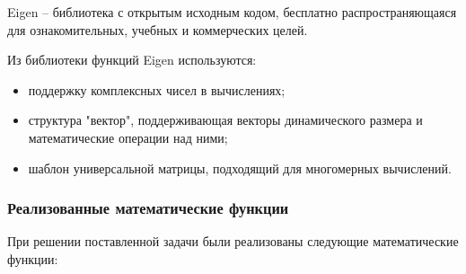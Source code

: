 Eigen -- библиотека с открытым исходным кодом, бесплатно распространяющаяся для ознакомительных, учебных и коммерческих целей. 

Из библиотеки функций Eigen используются:
\begin{itemize}
    \item поддержку комплексных чисел в вычислениях;
    \item структура "вектор", поддерживающая векторы динамического размера и математические операции над ними;
    \item шаблон универсальной матрицы, подходящий для многомерных вычислений. 
\end{itemize}

\newpage
\subsubsection{\textbf{Реализованные математические функции}}

При решении поставленной задачи были реализованы следующие математические функции:

